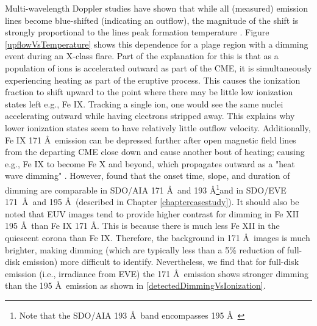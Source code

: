 Multi-wavelength Doppler studies have shown that while all (measured) emission lines become blue-shifted (indicating an outflow), the magnitude of the shift is strongly proportional to the lines peak formation temperature \citep{Imada2007, Jin2009}. Figure \ref{upflowVsTemperature} shows this dependence for a plage region with a dimming event during an X-class flare. Part of the explanation for this is that as a population of ions is accelerated outward as part of the CME, it is simultaneously experiencing heating as part of the eruptive process. This causes the ionization fraction to shift upward to the point where there may be little low ionization states left e.g., Fe IX. Tracking a single ion, one would see the same nuclei accelerating outward while having electrons stripped away. This explains why lower ionization states seem to have relatively little outflow velocity. Additionally, Fe IX 171 \AA\ emission can be depressed further after open magnetic field lines from the departing CME close down and cause another bout of heating; causing e.g., Fe IX to become Fe X and beyond, which propagates outward as a "heat wave dimming" \citep{Robbrecht2010}. However, \citet{Mason2014} found that the onset time, slope, and duration of dimming are comparable in SDO/AIA 171 \AA\ and 193 \AA\footnote{Note that the SDO/AIA 193 \AA\ band encompasses 195 \AA\ }and in SDO/EVE 171 \AA\ and 195 \AA\ (described in Chapter \ref{chaptercasestudy}). It should also be noted that EUV images tend to provide higher contrast for dimming in Fe XII 195 \AA\ than Fe IX 171 \AA. This is because there is much less Fe XII in the quiescent corona than Fe IX. Therefore, the background in 171 \AA\ images is much brighter, making dimming (which are typically less than a 5\% reduction of full-disk emission) more difficult to identify. Nevertheless, we find that for full-disk emission (i.e., irradiance from EVE) the 171 \AA\ emission shows stronger dimming than the 195 \AA\ emission as shown in \ref{detectedDimmingVsIonization}. 

